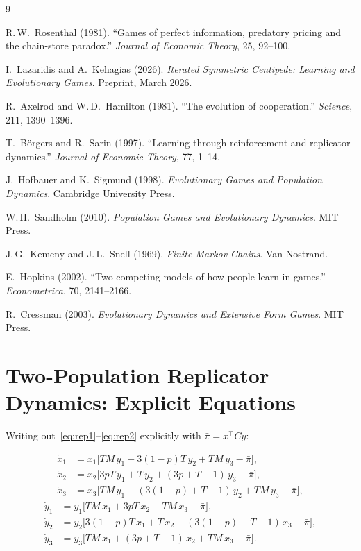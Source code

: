 \documentclass[12pt,a4paper]{article}
\begin{document}
\begin{thebibliography}{9}

  R.\,W.~Rosenthal (1981).
  ``Games of perfect information, predatory pricing and the chain-store
  paradox.''
  \textit{Journal of Economic Theory}, 25, 92--100.

  I.~Lazaridis and A.~Kehagias (2026).
  \textit{Iterated Symmetric Centipede: Learning and Evolutionary Games}.
  Preprint, March 2026.

  R.~Axelrod and W.\,D.~Hamilton (1981).
  ``The evolution of cooperation.''
  \textit{Science}, 211, 1390--1396.

  T.~B\"{o}rgers and R.~Sarin (1997).
  ``Learning through reinforcement and replicator dynamics.''
  \textit{Journal of Economic Theory}, 77, 1--14.

  J.~Hofbauer and K.~Sigmund (1998).
  \textit{Evolutionary Games and Population Dynamics}.
  Cambridge University Press.

  W.\,H.~Sandholm (2010).
  \textit{Population Games and Evolutionary Dynamics}.
  MIT Press.

  J.\,G.~Kemeny and J.\,L.~Snell (1969).
  \textit{Finite Markov Chains}.
  Van Nostrand.

  E.~Hopkins (2002).
  ``Two competing models of how people learn in games.''
  \textit{Econometrica}, 70, 2141--2166.

  R.~Cressman (2003).
  \textit{Evolutionary Dynamics and Extensive Form Games}.
  MIT Press.

\end{thebibliography}

\appendix

\section{Two-Population Replicator Dynamics: Explicit Equations}
\label{app:explicit}

Writing out~\eqref{eq:rep1}--\eqref{eq:rep2} explicitly with
$\bar\pi = x^\top Cy$:

\begin{align*}
\dot x_1 &= x_1\bigl[TM\,y_1 + 3(1-p)T\,y_2 + TM\,y_3 - \bar\pi\bigr],\\
\dot x_2 &= x_2\bigl[3pT\,y_1 + T\,y_2 + (3p+T-1)\,y_3 - \bar\pi\bigr],\\
\dot x_3 &= x_3\bigl[TM\,y_1 + (3(1-p)+T-1)\,y_2 + TM\,y_3 - \bar\pi\bigr],
\end{align*}
\begin{align*}
\dot y_1 &= y_1\bigl[TM\,x_1 + 3pT\,x_2 + TM\,x_3 - \bar\pi\bigr],\\
\dot y_2 &= y_2\bigl[3(1-p)T\,x_1 + T\,x_2 + (3(1-p)+T-1)\,x_3 - \bar\pi\bigr],\\
\dot y_3 &= y_3\bigl[TM\,x_1 + (3p+T-1)\,x_2 + TM\,x_3 - \bar\pi\bigr].
\end{align*}
\end{document}
